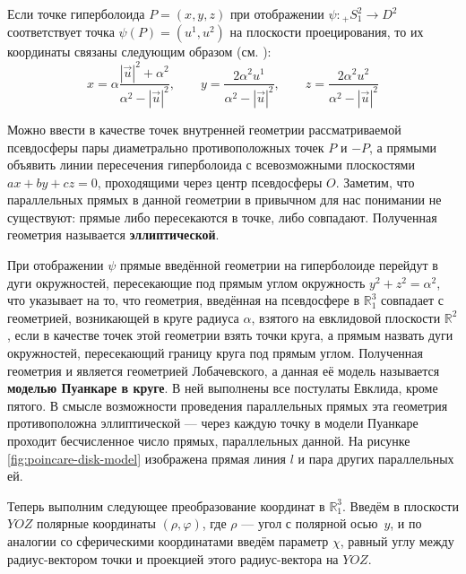 \documentclass{article}
\numberwithin{equation}{section}
\renewcommand{\phi}{\varphi}
\newcommand{\neword}[1]{\textbf{#1}}
\providecommand{\abs}[1]{\left \lvert{#1}\right \rvert}
\begin{document}
Если точке гиперболоида $P = (x, y, z)$ при отображении $\psi \colon
{}_+S^2_1 \to D^2$ соответствует точка $\psi(P) = (u^1, u^2)$ на
плоскости проецирования, то их координаты связаны следующим образом
(см. \cite{fomenko00}):
\begin{equation}\label{eq:hyperboloid-to-plane}
  x = \alpha\frac{\abs{\vec{u}}^2 + \alpha^2}{\alpha^2 -
    \abs{\vec{u}}^2}, \qquad
  y = \frac{2 \alpha^2 u^1}{\alpha^2 - \abs{\vec{u}}^2}, \qquad
  z = \frac{2 \alpha^2 u^2}{\alpha^2 - \abs{\vec{u}}^2}
\end{equation}

Можно ввести в качестве точек внутренней геометрии рассматриваемой
псевдосферы пары диаметрально противоположных точек $P$ и $-P$, а
прямыми объявить линии пересечения гиперболоида с всевозможными
плоскостями $ax+by+cz=0$, проходящими через центр псевдосферы $O$.
Заметим, что параллельных прямых в данной геометрии в привычном для
нас понимании не существуют: прямые либо пересекаются в точке, либо
совпадают. Полученная геометрия называется \neword{эллиптической}.

При отображении $\psi$ прямые введённой геометрии на гиперболоиде
перейдут в дуги окружностей, пересекающие под прямым углом окружность
$y^2 + z^2 = \alpha^2$, что указывает на то, что геометрия, введённая
на псевдосфере в $\mathbb{R}^3_1$ совпадает с геометрией, возникающей
в круге радиуса $\alpha$, взятого на евклидовой плоскости
$\mathbb{R}^2$, если в качестве точек этой геометрии взять точки
круга, а прямым назвать дуги окружностей, пересекающий границу круга
под прямым углом. Полученная геометрия и является геометрией
Лобачевского, а данная её модель называется \neword{моделью Пуанкаре в
  круге}. В ней выполнены все постулаты Евклида, кроме пятого. В
смысле возможности проведения параллельных прямых эта геометрия
противоположна эллиптической — через каждую точку в модели Пуанкаре
проходит бесчисленное число прямых, параллельных данной. На рисунке
\ref{fig:poincare-disk-model} изображена прямая линия $l$ и пара
других параллельных ей.



Теперь выполним следующее преобразование координат в $\mathbb{R}^3_1$.
Введём в плоскости $YOZ$ полярные координаты $(\rho, \phi)$, где
$\rho$ — угол с полярной осью $y$, и по аналогии со сферическими
координатами введём параметр $\chi$, равный углу между
радиус-вектором точки и проекцией этого радиус-вектора на $YOZ$.
\end{document}
